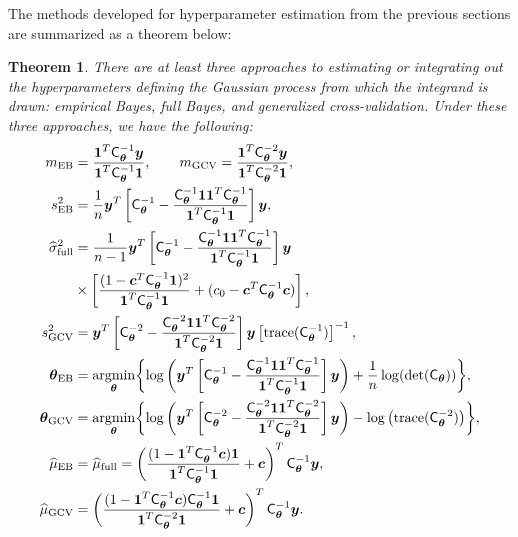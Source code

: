 \documentclass{iitthesis}          %
\newcommand{\bm}[1]{\boldsymbol{#1}}
\newcommand{\trace}[1]{\textup{trace}{#1}}
\newcommand{\vtheta}{{\bm{\theta}}}
\newcommand{\vc}{\bm{c}}
\newcommand{\vy}{\bm{y}}
\newcommand{\vone}{\bm{1}}
\newcommand{\mC}{\mathsf{C}}
\newcommand{\mCthetaInv}{{\mathsf{C}^{-1}_{\vtheta}}}
\newcommand{\hmu}{\widehat{\mu}}
\newcommand{\hsigma}{\widehat{\sigma}}
\newcommand{\MLE}{\textup{EB}}
\newcommand{\full}{\textup{full}}
\newcommand{\GCV}{\textup{GCV}}
\providecommand{\argmin}{\operatorname*{argmin}}
\newtheorem{theorem}{Theorem}[section]
\begin{document}
The methods developed for hyperparameter estimation from the previous sections are summarized as a theorem below:
\begin{theorem} \label{thm:param} There are at least three approaches to estimating or integrating out the hyperparameters defining the Gaussian process from which the integrand is drawn: empirical Bayes, full Bayes, and generalized cross-validation.  %
Under these three approaches, we have the following:
	\begin{align}
	\label{eqn_m_MLE}
	m_\MLE &= \frac{\vone^T \mCthetaInv \vy }{ \vone^T \mCthetaInv \vone}, \qquad
	m_{\textup{GCV}} = \frac{\vone^T \mC_\vtheta^{-2} \vy}{\vone^T \mC_\vtheta^{-2} \vone}, \\
	\label{eqn_s2_MLE}
	s^2_{\MLE} 
	&= 
	\frac{1}{n}
	\vy^T 
	\left[ \mCthetaInv - 
	\frac{ \mCthetaInv \vone \vone^T \mCthetaInv }{\vone^T\mCthetaInv \vone}
	\right] \vy, \\
	\nonumber
	\hsigma_{\full}^2 
	& = \frac{1}{n-1}
	\vy^T\left[ \mCthetaInv 
	- \frac{ \mCthetaInv \vone\vone^T \mCthetaInv}{\vone^T \mCthetaInv \vone}  \right]\vy
	\\ 
	\label{eqn:sigma2_full}
	& \times  \left[\frac{(1 - \vc^T \mCthetaInv \vone)^2}{\vone^T \mCthetaInv \vone} + (c_{0}  -\vc ^T \mCthetaInv \vc) \right], \\
	\nonumber
	s^2_{\textup{GCV}} & = \vy^T \left[\mC_\vtheta^{-2} - \frac{\mC_\vtheta^{-2} \vone \vone^T \mC_\vtheta^{-2}}{\vone^T \mC_\vtheta^{-2} \vone}  \right] \vy  \left[ \trace(\mCthetaInv) \right]^{-1}, \\
	\label{eqn:thetaMLE}
	\vtheta_\MLE
	&= \argmin_{\vtheta} \biggl \{
	\log\left(\vy^T 
	\left[ \mCthetaInv - 
	\frac{ \mCthetaInv \vone \vone^T \mCthetaInv }{\vone^T\mCthetaInv \vone}
	\right] \vy 
	\right)  
	+  \frac{1}{n} \log(\det(\mC_\vtheta))
	\biggr \}, \\
	\label{vthetaGCV}
	\vtheta_{\GCV} &= \argmin_\vtheta \biggl\{\log \left(  \vy^T \left[\mC^{-2}_\vtheta - \frac{\mC^{-2}_\vtheta \vone \vone^T \mC^{-2}_\vtheta}{\vone^T \mC^{-2}_\vtheta \vone}  \right] \vy \right)  
	- \log \left ( \trace(\mC^{-2}_\vtheta) \right ) \biggr\}, \\
	\label{eqn:cubMLE}
	\hmu_\MLE  &= \hmu_\full =
	\left(
	\frac{ (1 - \vone^T  \mCthetaInv\vc )  \vone }{ \vone^T \mCthetaInv \vone}   +  \vc 
	\right)^T  \mCthetaInv \vy, \\
	\label{eqn:muCV}
	\hmu_{\GCV}
	& = \left(\frac{(1 - \vone^T  \mCthetaInv\vc) \mCthetaInv \vone}{\vone^T \mC_\vtheta^{-2} \vone} + \vc \right)^T \mCthetaInv \vy.

\end{align}
\end{theorem}
\end{document}
